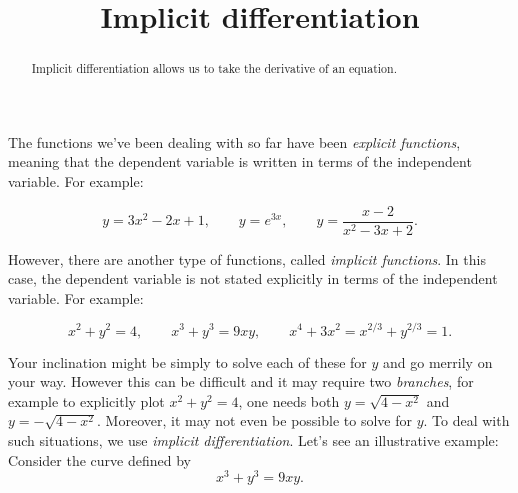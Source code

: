 \documentclass{ximera}
\title{Implicit differentiation}
\begin{document}
\begin{abstract}
 Implicit differentiation allows us to take the derivative of an
 equation.
\end{abstract}
\maketitle

The functions we've been dealing with so far have been
\textit{explicit functions}, meaning that the
dependent variable is written in terms of the independent
variable. For example:

\[
y=3x^2-2x+1,\qquad y=e^{3x}, \qquad y = \frac{x-2}{x^2-3x+2}.
\]

However, there are another type of functions, called \textit{implicit
  functions}. In this case, the dependent variable is not stated
explicitly in terms of the independent variable. For example:

\[
x^2+y^2 = 4,\qquad x^3+y^3 = 9xy, \qquad x^4+3x^2 = x^{2/3}+y^{2/3} = 1.
\]

Your inclination might be simply to solve each of these for $y$ and go
merrily on your way. However this can be difficult and it may require
two \textit{branches}, for example to explicitly plot $x^2+y^2 = 4$,
one needs both $y= \sqrt{4-x^2}$ and $y=-\sqrt{4-x^2}$. Moreover, it
may not even be possible to solve for $y$. To deal with such
situations, we use \textit{implicit differentiation}. Let's see an
illustrative example: Consider the curve defined by
\[
x^3+y^3 = 9xy.
\]


\end{document}
